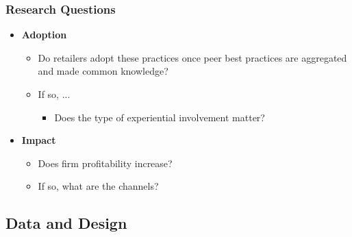 \documentclass[hideothersubsections, usenames,dvipsnames,10pt]{beamer}
\begin{document}
\begin{frame}
\frametitle{Research Questions}
	\begin{itemize}
	\item \textbf{Adoption}
		\begin{itemize}
		\item Do retailers adopt these practices once peer best practices are aggregated and made common knowledge?
		\item If so, ...
			\begin{itemize}
			\item Does the type of experiential involvement matter?
			\end{itemize}
		\end{itemize}
    \vspace{0.3in}
	\item \textbf{Impact}
		\begin{itemize}
		\item Does firm profitability increase?
		\item If so, what are the channels?
		\end{itemize}
	\end{itemize}
\end{frame}

\subsection{Data and Design}
\end{document}
